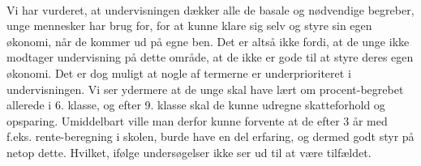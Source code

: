 \\
Vi har vurderet, at undervisningen dækker alle de basale og nødvendige begreber, unge mennesker har brug for, for at kunne klare sig selv og styre sin egen økonomi, når de kommer ud på egne ben. Det er altså ikke fordi, at de unge ikke modtager undervisning på dette område, at de ikke er gode til at styre deres egen økonomi. Det er dog muligt at nogle af termerne er underprioriteret i undervisningen. Vi ser ydermere at de unge skal have lært om procent-begrebet allerede i 6. klasse, og efter 9. klasse skal de kunne udregne skatteforhold og opsparing. Umiddelbart ville man derfor kunne forvente at de efter 3 år med f.eks. rente-beregning i skolen, burde have en del erfaring, og dermed godt styr på netop dette. Hvilket, ifølge undersøgelser ikke ser ud til at være tilfældet.
